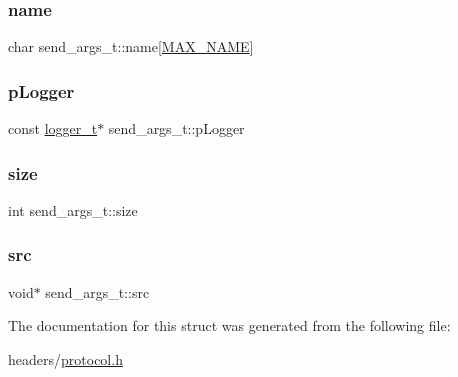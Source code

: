 \mbox{\label{structsend__args__t_ad858929a0359a7cb06cd971619ef0baa}} 
\subsubsection{\texorpdfstring{name}{name}}
{\footnotesize\ttfamily char send\+\_\+args\+\_\+t\+::name\mbox{[}\hyperlink{datatypes_8h_ac7c0207aa5a0e10d378be03b68041350}{M\+A\+X\+\_\+\+N\+A\+ME}\mbox{]}}

\mbox{\label{structsend__args__t_a70fc025c17db3230f4f607415a9408e5}} 
\subsubsection{\texorpdfstring{p\+Logger}{pLogger}}
{\footnotesize\ttfamily const \hyperlink{structlogger__t}{logger\+\_\+t}$\ast$ send\+\_\+args\+\_\+t\+::p\+Logger}

\mbox{\label{structsend__args__t_a6b05eee147bc0506bc00ab759732adba}} 
\subsubsection{\texorpdfstring{size}{size}}
{\footnotesize\ttfamily int send\+\_\+args\+\_\+t\+::size}

\mbox{\label{structsend__args__t_a1157e08ddef1b804c8609b013a14b02a}} 
\subsubsection{\texorpdfstring{src}{src}}
{\footnotesize\ttfamily void$\ast$ send\+\_\+args\+\_\+t\+::src}



The documentation for this struct was generated from the following file\+:\begin{DoxyCompactItemize}
\item 
headers/\hyperlink{protocol_8h}{protocol.\+h}\end{DoxyCompactItemize}
